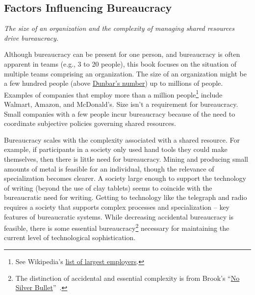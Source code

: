\subsection*{Factors Influencing Bureaucracy}

\textit{The size of an organization and the complexity of managing shared resources drive bureaucracy.}

Although bureaucracy can be present for one person, and bureaucracy is often apparent in teams (e.g., 3 to 20 people), this book focuses on the situation of multiple teams comprising an organization. The size of an organization might be a few hundred people (above \href{https://en.wikipedia.org/wiki/Dunbar\%27s_number}{Dunbar's number})\iftoggle{WPinmargin}{\marginpar{$>$Wikipedia: Dunbar's number}}{}
 up to millions of people. 
Examples of companies that employ more than a million people\footnote{See Wikipedia's \href{https://en.wikipedia.org/wiki/List_of_largest_employers}{list of largest employers}.
} include Walmart, Amazon, and McDonald's. Size isn't a requirement for bureaucracy. Small companies with a few people incur bureaucracy because of the need to coordinate subjective policies governing shared resources. 


Bureaucracy scales with the complexity associated with a shared resource. For example, if participants in a society only used hand tools they could make themselves, then there is little need for bureaucracy. Mining and producing small amounts of metal is feasible for an individual, though the relevance of specialization becomes clearer. A society large enough to support the technology of writing (beyond the use of clay tablets) seems to coincide with the bureaucratic need for writing. Getting to technology like the telegraph and radio requires a society that supports complex processes and specialization -- key features of bureaucratic systems. While decreasing accidental bureaucracy is feasible, there is some essential bureaucracy\footnote{The distinction of accidental and essential complexity is from Brook's 
``\href{https://en.wikipedia.org/wiki/No_Silver_Bullet\%23Summary}{No Silver Bullet}''~\cite{1986_brooks}.
}
necessary for maintaining the current level of technological sophistication. 

